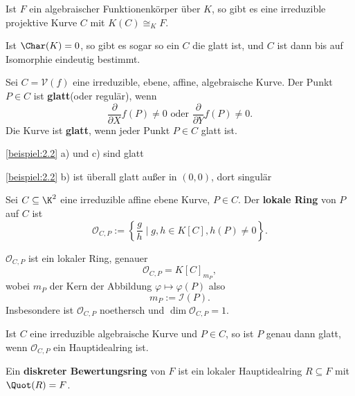 \begin{theorem}
    Ist $F$ ein algebraischer Funktionenkörper über $K$, so gibt es eine irreduzible projektive Kurve
    $C$ mit $K(C) \cong_K F$.
    
    Ist $\Char(K)=0$, so gibt es sogar so ein $C$ die glatt ist, und $C$ ist dann bis auf Isomorphie eindeutig bestimmt.
\end{theorem}

\begin{definition}
    Sei $C = \mathcal{V}(f)$ eine irreduzible, ebene, affine, algebraische Kurve. Der Punkt $P \in C$ ist
    \textbf{glatt}(oder regulär), wenn
    $$ \frac{\partial}{\partial X}f(P) \neq 0 \text{ oder } \frac{\partial}{\partial Y} f(P) \neq 0.$$
    Die Kurve ist \textbf{glatt}, wenn jeder Punkt $P \in C$ glatt ist.
\end{definition}

\begin{beispiel}
    \cref{beispiel:2.2} a) und c) sind glatt

    \cref{beispiel:2.2} b) ist überall glatt außer in $(0,0)$, dort singulär
\end{beispiel}

\begin{definition}
    Sei $C\subseteq \K^2$ eine irreduzible affine ebene Kurve, $P \in C$. 
    Der \textbf{lokale Ring} von $P$ auf $C$ ist
    $$ \mathcal{O}_{C,P} := \left\{\frac{g}{h}\mid g,h\in K[C], h(P) \ne0\right\}.$$
\end{definition}

\begin{bemerkungnr}
    $\mathcal{O}_{C,P}$ ist ein lokaler Ring, genauer
    $$ \mathcal{O}_{C,P} = K[C]_{m_P},$$
    wobei $m_P$ der Kern der Abbildung $\varphi \mapsto \varphi(P)$ also
    $$ m_P := \mathcal{I}(P). $$
    Insbesondere ist $\mathcal{O}_{C,P}$ noethersch und $\dim \mathcal{O}_{C,P} = 1$.
\end{bemerkungnr}

\begin{satz}
    Ist $C$ eine irreduzible algebraische Kurve und $P \in C$, so ist $P$ genau dann glatt, wenn 
    $\mathcal{O}_{C,P}$ ein Hauptidealring ist.
\end{satz}

\begin{definition}
    Ein \textbf{diskreter Bewertungsring} von $F$ ist ein lokaler Hauptidealring $R \subseteq F$ mit $\Quot(R) = F$.
\end{definition}

